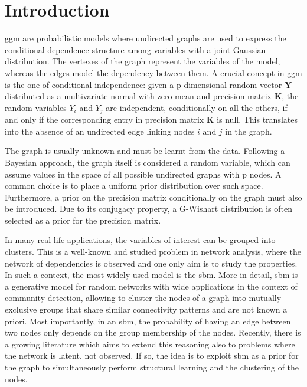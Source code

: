 
\section{Introduction}
\gls{ggm} are probabilistic models where undirected graphs are used to express the conditional dependence structure among variables with a joint Gaussian distribution. The vertexes of the graph represent the variables of the model, whereas the edges model the dependency between them. A crucial concept in \gls{ggm} is the one of conditional independence: given a p-dimensional random vector $\mathbf{Y}$ distributed as a multivariate normal with zero mean and precision matrix $\mathbf{K}$, the random variables $Y_i$ and $Y_j$ are independent, conditionally on all the others, if and only if the corresponding entry in precision matrix $\mathbf{K}$ is null. This translates into the absence of an undirected edge linking nodes $i$ and $j$ in the graph. 

The graph is usually unknown and must be learnt from the data. Following a Bayesian approach, the graph itself is considered a random variable, which can assume values in the space of all possible undirected graphs with p nodes. A common choice is to place a uniform prior distribution over such space. Furthermore, a prior on the precision matrix conditionally on the graph must also be introduced. Due to its conjugacy property, a G-Wishart distribution is often selected as a prior for the precision matrix.

In many real-life applications, the variables of interest can be grouped into clusters. This is a well-known and studied problem in network analysis, where the network of dependencies is observed and one only aim is to study the properties. In such a context, the most widely used model is the \gls{sbm}. More in detail, \gls{sbm} is a generative model for random networks with wide applications in the context of community detection, allowing to cluster the nodes of a graph into mutually exclusive groups that share similar connectivity patterns and are not known a priori. Most importantly, in an \gls{sbm}, the probability of having an edge between two nodes only depends on the group membership of the nodes. Recently, there is a growing literature which aims to extend this reasoning also to problems where the network is latent, not observed. If so, the idea is to exploit \gls{sbm} as a prior for the graph to simultaneously perform structural learning and the clustering of the nodes.

